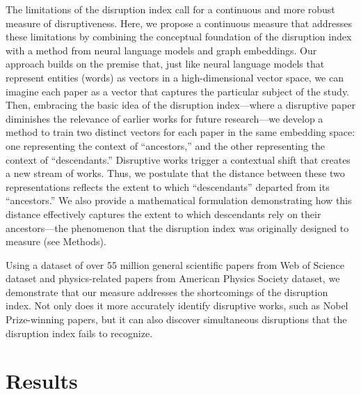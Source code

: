 \documentclass[12pt]{article}
\begin{document}
The limitations of the disruption index call for a continuous and more robust measure of disruptiveness. Here, we propose a continuous measure that addresses these limitations by combining the conceptual foundation of the disruption index with a method from neural language models and graph embeddings. Our approach builds on the premise that, just like neural language models that represent entities (words) as vectors in a high-dimensional vector space, we can imagine each paper as a vector that captures the particular subject of the study. Then, embracing the basic idea of the disruption index---where a disruptive paper diminishes the relevance of earlier works for future research---we develop a method to train two distinct vectors for each paper in the same embedding space: one representing the context of ``ancestors,'' and the other representing the context of ``descendants.'' Disruptive works trigger a contextual shift that creates a new stream of works. Thus, we postulate that the distance between these two representations reflects the extent to which ``descendants'' departed from its ``ancestors.'' We also provide a mathematical formulation demonstrating how this distance effectively captures the extent to which descendants rely on their ancestors---the phenomenon that the disruption index was originally designed to measure (see Methods).


Using a dataset of over 55 million general scientific papers from Web of Science dataset and physics-related papers from American Physics Society dataset, we demonstrate that our measure addresses the shortcomings of the disruption index. Not only does it more accurately identify disruptive works, such as Nobel Prize-winning papers, but it can also discover simultaneous disruptions that the disruption index fails to recognize. 



\section{Results}
\label{sec:result}
\end{document}
